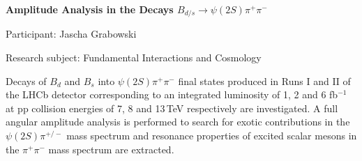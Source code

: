 \begin{minipage}[t]{1.0\textwidth}

\begin{center}

{{\large\bfseries Amplitude Analysis in the Decays $B_{d/s}\rightarrow\psi(2S)\pi^+\pi^-$}\par}

\end{center}

{\noindent Participant: Jascha Grabowski\par} 

{\noindent Research subject: Fundamental Interactions and Cosmology\par}\medskip

\noindent Decays of $B_{d}$ and $B_s$ into $\psi(2S)\pi^+\pi^-$ final states produced in Runs I and II of the LHCb detector corresponding to an integrated luminosity of 1, 2 and 6 fb$^{-1}$ at pp collision energies of 7, 8 and 13\,TeV respectively are investigated. A full angular amplitude analysis is performed to search for exotic contributions in the $\psi(2S)\pi^{+/-}$ mass spectrum and resonance properties of excited scalar mesons in the $\pi^+ \pi^-$ mass spectrum are extracted.
\par\end{minipage}

\hfill 

